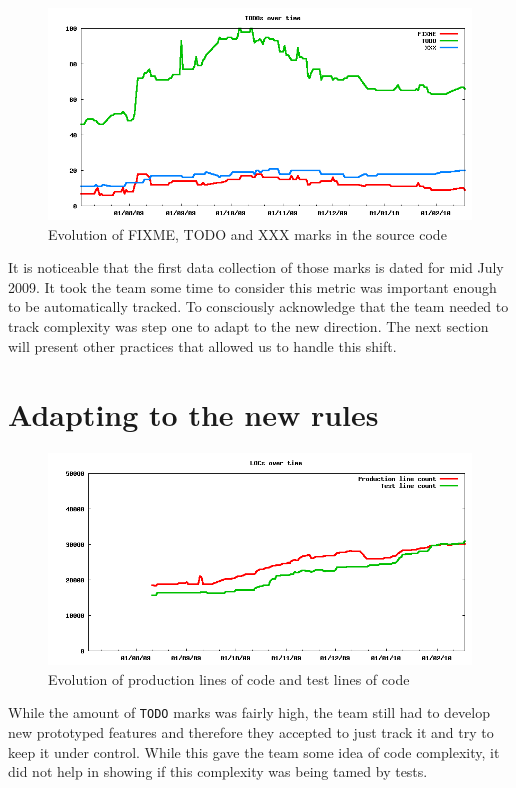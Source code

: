 \documentclass[lnbip]{svmultln}
\begin{document}
\begin{figure}[hbt]
  \centerline{
    \includegraphics[width=120mm]{TODOs.png}
  }
  \caption{Evolution of FIXME, TODO and XXX marks in the source code}
  \label{fig:TODOs}
\end{figure}

It is noticeable that the first data collection of those marks is dated for mid
July 2009. It took the team some time to consider this metric was important
enough to be automatically tracked. To consciously acknowledge that the team
needed to track complexity was step one to adapt to the new direction. The next
section will present other practices that allowed us to handle this shift.

\section{Adapting to the new rules}
\label{sec:adapting}

\begin{figure}[hbt]
  \centerline{
    \includegraphics[width=120mm]{LOCs.png}
  }
  \caption{Evolution of production lines of code and test lines of
    code}
  \label{fig:LOCs}
\end{figure}

While the amount of \texttt{TODO} marks was fairly high, the team
still had to develop new prototyped features and therefore they
accepted to just track it and try to keep it under control. While this
gave the team some idea of code complexity, it did not help in showing
if this complexity was being tamed by tests.
\end{document}
